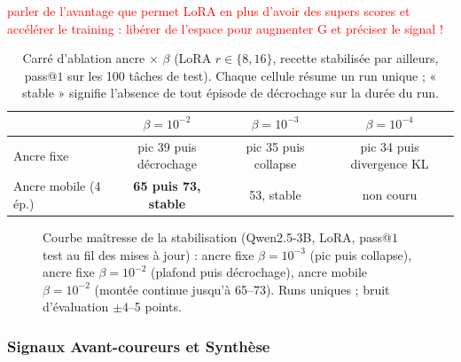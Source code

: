 \documentclass[11pt,a4paper]{article}
\begin{document}
\textcolor{red}{parler de l'avantage que permet LoRA en plus d'avoir des supers scores et accélérer le training : libérer de l'espace pour augmenter G et préciser le signal !} 

\begin{table}[htbp]
\centering
\caption{Carré d'ablation ancre $\times$ $\beta$ (LoRA $r \in \{8, 16\}$, recette stabilisée par ailleurs, pass@$1$ sur les 100 tâches de test). Chaque cellule résume un run unique ; « stable » signifie l'absence de tout épisode de décrochage sur la durée du run.}
\label{tab:anchor_beta}
\begin{tabular}{lccc}
\toprule
 & $\beta = 10^{-2}$ & $\beta = 10^{-3}$ & $\beta = 10^{-4}$ \\
\midrule
Ancre fixe & pic 39 puis décrochage & pic 35 puis collapse & pic 34 puis divergence KL \\
Ancre mobile (4 ép.) & \textbf{65 puis 73, stable} & 53, stable & non couru \\
\bottomrule
\end{tabular}
\end{table}

\begin{figure}[htbp]
    \centering
    \caption{Courbe maîtresse de la stabilisation (Qwen2.5-3B, LoRA, pass@$1$ test au fil des mises à jour) : ancre fixe $\beta=10^{-3}$ (pic puis collapse), ancre fixe $\beta=10^{-2}$ (plafond puis décrochage), ancre mobile $\beta=10^{-2}$ (montée continue jusqu'à 65--73). Runs uniques ; bruit d'évaluation $\pm 4$--5 points.}
    \label{fig:stabilization}
\end{figure}

\subsubsection{Signaux Avant-coureurs et Synthèse}
\end{document}
